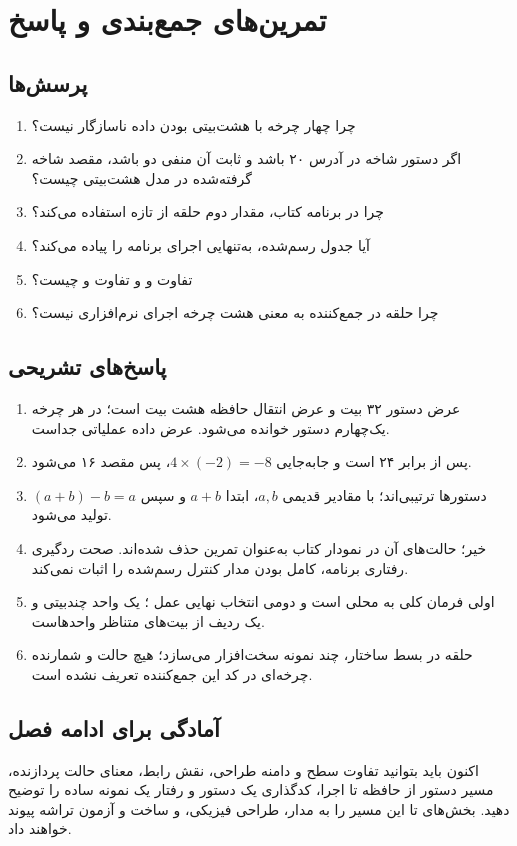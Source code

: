\section{تمرین‌های جمع‌بندی و پاسخ}
\subsection{پرسش‌ها}
\begin{enumerate}
\item چرا چهار چرخه  با هشت‌بیتی بودن داده ناسازگار نیست؟
\item اگر دستور شاخه در آدرس ۲۰ باشد و ثابت آن منفی دو باشد،
مقصد شاخه گرفته‌شده در مدل هشت‌بیتی چیست؟
\item چرا در برنامه کتاب، مقدار دوم حلقه از  تازه استفاده می‌کند؟
\item آیا جدول  رسم‌شده، به‌تنهایی اجرای  برنامه را پیاده می‌کند؟
\item تفاوت  و  و تفاوت  و  چیست؟
\item چرا حلقه  در جمع‌کننده به معنی هشت چرخه اجرای نرم‌افزاری نیست؟
\end{enumerate}

\subsection{پاسخ‌های تشریحی}
\begin{enumerate}
\item عرض دستور ۳۲ بیت و عرض انتقال حافظه هشت بیت است؛
در هر چرخه یک‌چهارم دستور خوانده می‌شود. عرض داده عملیاتی جداست.
\item {} پس از  برابر ۲۴ است و جابه‌جایی
\(4\times(-2)=-8\)، پس مقصد ۱۶ می‌شود.
\item دستورها ترتیبی‌اند؛ با مقادیر قدیمی \(a,b\)،
ابتدا \(a+b\) و سپس \((a+b)-b=a\) تولید می‌شود.
\item خیر؛ حالت‌های آن در نمودار کتاب به‌عنوان تمرین حذف شده‌اند.
صحت ردگیری رفتاری برنامه، کامل بودن مدار کنترل رسم‌شده را اثبات نمی‌کند.
\item اولی فرمان کلی  به  محلی است و دومی انتخاب نهایی عمل ؛
 یک واحد چندبیتی و  یک ردیف از بیت‌های متناظر واحدهاست.
\item حلقه در بسط ساختار، چند نمونه سخت‌افزار می‌سازد؛
هیچ حالت و شمارنده چرخه‌ای در کد این جمع‌کننده تعریف نشده است.
\end{enumerate}

\subsection{آمادگی برای ادامه فصل}
اکنون باید بتوانید تفاوت سطح و دامنه طراحی، نقش رابط، معنای حالت پردازنده،
مسیر دستور از حافظه تا اجرا، کدگذاری یک دستور و رفتار یک نمونه ساده  را توضیح دهید.
بخش‌های  تا  این مسیر را به مدار، طراحی فیزیکی،
 و ساخت و آزمون تراشه پیوند خواهند داد.
